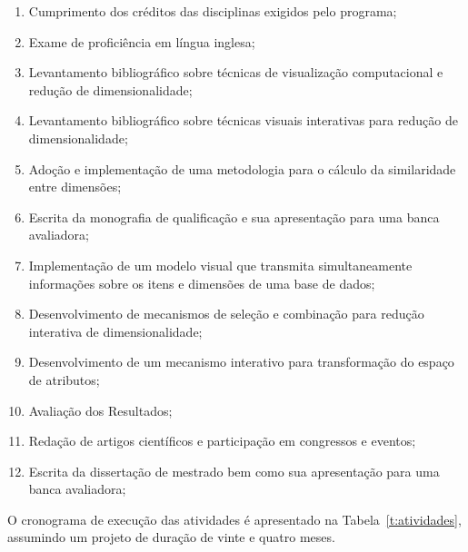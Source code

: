 \begin{enumerate}

    \item Cumprimento dos créditos das disciplinas exigidos pelo programa;

    \item Exame de proficiência em língua inglesa;

    \item Levantamento bibliográfico sobre técnicas de visualização computacional e redução de dimensionalidade;   

    \item Levantamento bibliográfico sobre técnicas visuais interativas para redução de dimensionalidade;  

    \item Adoção e implementação de uma metodologia para o cálculo da similaridade entre dimensões;

    \item Escrita da monografia de qualificação e sua apresentação para uma banca avaliadora;

    \item Implementação de um modelo visual que transmita simultaneamente informações sobre os itens e dimensões de uma base de dados;

    \item Desenvolvimento de mecanismos de seleção e combinação para redução interativa de dimensionalidade;

    \item Desenvolvimento de um mecanismo interativo para transformação do espaço de atributos;

    \item Avaliação dos Resultados;

    \item Redação de artigos científicos e participação em congressos e eventos; 

    \item Escrita da dissertação de mestrado bem como sua apresentação para uma banca avaliadora;

\end{enumerate}

O cronograma de execução das atividades é apresentado na Tabela~\ref{t:atividades}, assumindo um projeto de duração de vinte e quatro meses.

\newcommand{\y}{\color{black}\rule{20pt}{7pt}}
\newcommand{\x}{\hspace*{20pt}}
\renewcommand{\r}{\color{cinza}\rule{20pt}{7pt}}

